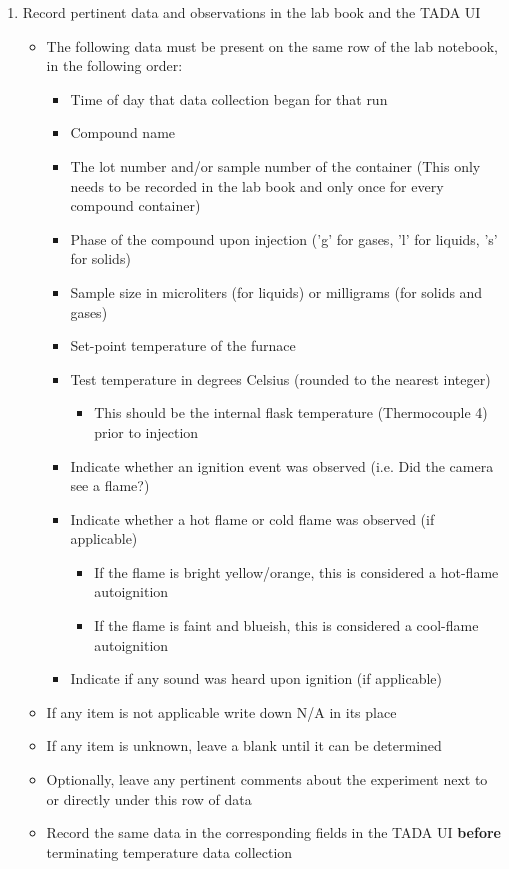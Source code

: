 \documentclass[letterpaper,11pt]{article}
\begin{document}
\begin{enumerate}
    \item Record pertinent data and observations in the lab book and the 
        TADA UI
        \begin{itemize}
        \item The following data must be present on the same row of the lab 
			notebook, in the following order:
            \begin{itemize}
            \item Time of day that data collection began for that run
            \item Compound name 
            \item The lot number and/or sample number of the 
                container (This only needs to be recorded in the lab book  and 
                only once for every compound container)
            \item Phase of the compound upon injection ('g' for gases, 'l' for 
                liquids, 's' for solids)
            \item Sample size in microliters (for liquids) or milligrams
                (for solids and gases)
            \item Set-point temperature of the furnace
            \item Test temperature in degrees Celsius (rounded to the 
                nearest integer)
                \begin{itemize}
                \item This should be the internal flask temperature 
                    (Thermocouple 4) prior to injection
                \end{itemize}
            \item Indicate whether an ignition event was observed (i.e. Did 
                the camera see a flame?)
            \item Indicate whether a hot flame or cold flame was observed (if 
                applicable)
                \begin{itemize}
                \item If the flame is bright yellow/orange, this is considered a 
                    hot-flame autoignition
                \item If the flame is faint and blueish, this is considered a 
                    cool-flame autoignition
                \end{itemize}
            \item Indicate if any sound was heard upon ignition (if applicable)
            \end{itemize}
        \item If any item is not applicable write down N/A in its place
        \item If any item is unknown, leave a blank until it can be determined
        \item Optionally, leave any pertinent comments about the experiment
            next to or directly under this row of data
        \item Record the same data in the corresponding fields in the TADA UI
            \textbf{before} terminating temperature data collection
        \end{itemize}
		

\end{enumerate}
\end{document}
